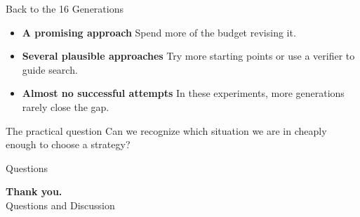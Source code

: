 \documentclass[aspectratio=1610,xcolor=dvipsnames,t]{beamer}
\begin{document}
\begin{frame}{Back to the 16 Generations}
  \begin{itemize}
    \item \textbf{A promising approach} \quad Spend more of the budget revising it.
    \item \textbf{Several plausible approaches} \quad Try more starting points or use a verifier to guide search.
    \item \textbf{Almost no successful attempts} \quad In these experiments, more generations rarely close the gap.
  \end{itemize}
  \medskip
  \begin{block}{The practical question}
    Can we recognize which situation we are in cheaply enough to choose a strategy?
  \end{block}
\end{frame}

\begin{frame}{Questions}
  \vfill
  \begin{center}
    {\Huge\color{unirot}\textbf{Thank you.}}\\[0.4cm]
    {\Large Questions and Discussion}
  \end{center}
  \vfill
\end{frame}
\end{document}
